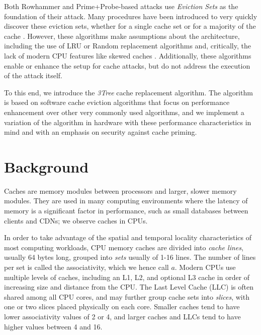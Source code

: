 \documentclass[letterpaper]{article}
\begin{document}
Both Rowhammer and Prime+Probe-based attacks use \textit{Eviction Sets}
as the foundation of their attack.
Many procedures have been introduced to very quickly discover these eviction sets,
whether for a single cache set \cite{TPFES}
or for a majority of the cache \cite{EvictionSetsAtScale}.
However, these algorithms make assumptions about the architecture,
including the use of LRU or Random replacement algorithms
and, critically, the lack of modern CPU features like skewed caches
\cite{EvictionSetsAtScale}.
Additionally, these algorithms enable or enhance the setup for cache attacks,
but do not address the execution of the attack itself.

To this end, we introduce the \textit{3Tree} cache replacement algorithm.
The algorithm is based on software cache eviction algorithms that focus on
performance enhancement over other very commonly used algorithms,
and we implement a variation of the algorithm in hardware
with these performance characteristics in mind
and with an emphasis on security against cache priming.

\section{Background}

Caches are memory modules between processors and larger, slower memory modules.
They are used in many computing environments where the latency of memory
is a significant factor in performance,
such as small databases between clients and CDNs; we observe caches in CPUs.

In order to take advantage of the spatial and temporal locality characteristics
of most computing workloads,
CPU memory caches are divided into \textit{cache lines}, usually 64 bytes long,
grouped into \textit{sets} usually of 1-16 lines.
The number of lines per set is called the associativity, which we hence call $a$.
Modern CPUs use multiple levels of caches, including an L1, L2, and optional L3 cache
in order of increasing size and distance from the CPU.
The Last Level Cache (LLC) is often shared among all CPU cores, and may further group
cache sets into \textit{slices}, with one or two slices placed physically on each core.
Smaller caches tend to have lower associativity values of 2 or 4, and larger caches and LLCs
tend to have higher values between 4 and 16.
\end{document}
